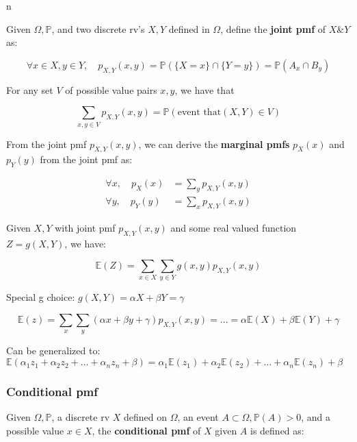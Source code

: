 n\documentclass{article}
\begin{document}
Given $\Omega, \mathbb{P}$, and two discrete rv's $X, Y$ defined in
$\Omega$, define the \textbf{joint pmf} of $X \& Y$ as:

\begin{equation}
  \tag{Joint pmf}
  \boxed{
    \forall x \in X, y \in Y, \quad p_{X,Y} (x,y) = \mathbb{P}(\{X=x\} \cap
    \{Y=y\}) = \mathbb{P}(A_x \cap B_y)
  }
\end{equation}

For any set $V$ of possible value pairs $x,y$, we have that

\[
  \sum_{x,y \in V} p_{X,Y} (x,y) = \mathbb{P}(\text{event that} (X,Y)
  \in V)
\]

From the joint pmf $p_{X,Y}(x,y)$, we can derive the \textbf{marginal
  pmfs} $p_X(x)$ and $p_Y(y)$ from the joint pmf as:

\begin{equation}
  \tag{Marginal Pmfs}
  \boxed{
    \begin{split}
      \forall x, \quad p_X(x) &= \sum_y p_{X,Y}(x,y) \\
      \forall y, \quad p_Y(y) &= \sum_x p_{X,Y}(x,y) 
    \end{split}
  }
\end{equation}

Given $X,Y$ with joint pmf $p_{X,Y}(x,y)$ and some real valued
function $Z=g(X,Y)$, we have:

\begin{equation}
  \tag{Joint Expected Value Rule}
  \boxed{
    \mathbb{E}(Z) = \sum_{x\in X} \sum_{y\in Y} g(x,y) p_{X,Y} (x,y)
  }
\end{equation}

Special g choice: $g(X,Y) = \alpha X + \beta Y = \gamma$

\[
  \mathbb{E}(z) = \sum_x \sum _y (\alpha x + \beta y + \gamma) p_{X,Y}
  (x,y) = \dots = \alpha\mathbb{E}(X) + \beta\mathbb{E}(Y) + \gamma
\]

Can be generalized to: $\mathbb{E}(\alpha_1z_1 + \alpha_2z_2 + \dots +
\alpha_nz_n + \beta) = \alpha_1 \mathbb{E}(z_1) + \alpha_2
\mathbb{E}(z_2) + \dots + \alpha_n \mathbb{E}(z_n) + \beta$

\subsubsection{Conditional pmf}

Given $\Omega, \mathbb{P}$, a discrete rv $X$ defined on $\Omega$, an
event $A \subset \Omega, \mathbb{P}(A) > 0$, and a possible value
$x \in X$, the \textbf{conditional pmf} of $X$ given $A$ is defined
as:
\end{document}
